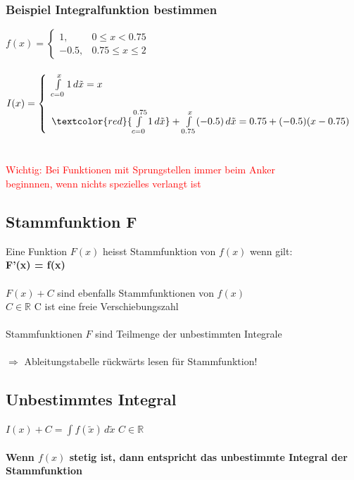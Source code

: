 		
		\subsubsection{Beispiel Integralfunktion bestimmen}
		$f(x)=\left\{\begin{array}{ll} 1, & 0 \leq x < 0.75 \\
         -0.5, & 0.75 \leq x \leq 2 \end{array} \right.$	\\
     \\
     $I(x)=\left\{\begin{array}{l} \int \limits_{c=0}^{x} 1 \, d \tilde{x} = x \\
     \\
     \textcolor{red}{\int \limits_{c=0}^{0.75} 1 \, d \tilde{x}} + \int \limits_{0.75}^{x} (-0.5) \, d \tilde{x} = 0.75 + (-0.5)(x-0.75)\end{array} \right. $ \\
         	\\
         	\\
         	\textcolor{red}{Wichtig: Bei Funktionen mit Sprungstellen immer beim Anker \\
         	beginnnen, wenn nichts spezielles verlangt ist} \\
         	
         	\columnbreak
         	
		\subsection{Stammfunktion F}
		Eine Funktion $F(x)$ heisst Stammfunktion von $f(x)$ wenn gilt: \\
		\textbf{F'(x) = f(x)} \\
		\\
		$F(x) + C$ sind ebenfalls Stammfunktionen von $f(x)$ \\
		$C \in \mathbb{R}$ \quad C ist eine freie Verschiebungszahl\\
		\\
		Stammfunktionen $F$ sind Teilmenge der unbestimmten Integrale\\
		\\
		$\Rightarrow$ Ableitungstabelle rückwärts lesen für Stammfunktion!
		
		
		\subsection{Unbestimmtes Integral}
			$I(x) + C = \int \limits f(\tilde{x}) \, d\tilde{x} $ \quad  $C \in \mathbb{R}$ \\
			\\
			\textbf{Wenn $f(x)$ stetig ist, dann entspricht das unbestimmte Integral der Stammfunktion}
		
